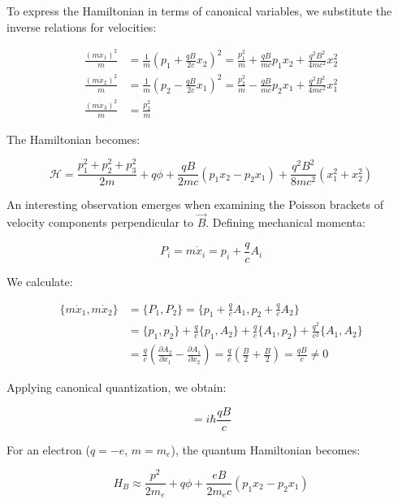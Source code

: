 \documentclass[italian]{HKNdocument}
\begin{document}
To express the Hamiltonian in terms of canonical variables, we substitute the inverse relations for velocities:

\begin{align*}
\frac{(m\dot{x}_{1})^{2}}{m} &= \frac{1}{m}(p_{1}+\frac{q B}{2 c} x_{2})^{2}=\frac{p_{1}^{2}}{m}+\frac{q B}{m c} p_{1}x_{2}+\frac{q^{2}B^{2}}{4mc^{2}}x_{2}^{2} \\
\frac{(m\dot{x}_{2})^{2}}{m} &= \frac{1}{m}(p_{2}-\frac{q B}{2 c} x_{1})^{2}=\frac{p_{2}^{2}}{m}-\frac{q B}{m c}p_{2}x_{1}+\frac{q^{2}B^{2}}{4mc^{2}}x_{1}^{2}  \tag{12.9}\\
\frac{(m\dot{x}_{3})^{2}}{m} &= \frac{p_{3}^{2}}{m}
\end{align*}

The Hamiltonian becomes:

\begin{equation*}
\mathcal{H}=\frac{p_{1}^{2}+p_{2}^{2}+p_{3}^{2}}{2m}+q\phi+\frac{qB}{2mc}(p_{1}x_{2}-p_{2}x_{1})+\frac{q^{2}B^{2}}{8mc^{2}}(x_{1}^{2}+x_{2}^{2}) \tag{12.10}
\end{equation*}

An interesting observation emerges when examining the Poisson brackets of velocity components perpendicular to $\vec{B}$. Defining mechanical momenta:

\begin{equation*}
P_{i}=m\dot{x}_{i}=p_{i}+\frac{q}{c}A_{i} \tag{12.11}
\end{equation*}

We calculate:

\begin{align*}
\{m\dot{x}_{1},m\dot{x}_{2}\} &= \{P_{1},P_{2}\}=\{p_{1}+\frac{q}{c}A_{1},p_{2}+\frac{q}{c}A_{2}\}\\
&= \{p_{1},p_{2}\}+\frac{q}{c}\{p_{1},A_{2}\}+\frac{q}{c}\{A_{1},p_{2}\}+\frac{q^{2}}{c^{2}}\{A_{1},A_{2}\}\\
&= \frac{q}{c}(\frac{\partial A_{2}}{\partial x_{1}}-\frac{\partial A_{1}}{\partial x_{2}})=\frac{q}{c}(\frac{B}{2}+\frac{B}{2})=\frac{qB}{c}\neq 0 \tag{12.12}
\end{align*}

Applying canonical quantization, we obtain:

\begin{equation*}
[P_{1},P_{2}]=i\hbar\frac{qB}{c} \tag{12.13}
\end{equation*}

For an electron ($q=-e$, $m=m_e$), the quantum Hamiltonian becomes:

\begin{equation*}
H_{B}\approx\frac{p^{2}}{2m_e}+q\phi+\frac{eB}{2m_e c}(p_{1}x_{2}-p_{2}x_{1}) \tag{12.14}
\end{equation*}
\end{document}
